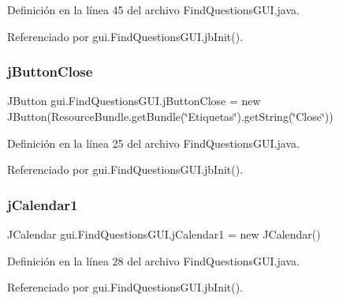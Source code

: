Definición en la línea 45 del archivo Find\+Questions\+G\+U\+I.\+java.



Referenciado por gui.\+Find\+Questions\+G\+U\+I.\+jb\+Init().

\mbox{\label{classgui_1_1FindQuestionsGUI_aa434da3107eda36011f1dd89b1c02d65}} 
\subsubsection{\texorpdfstring{jButtonClose}{jButtonClose}}
{\footnotesize\ttfamily J\+Button gui.\+Find\+Questions\+G\+U\+I.\+j\+Button\+Close = new J\+Button(Resource\+Bundle.\+get\+Bundle(\char`\"{}Etiquetas\char`\"{}).get\+String(\char`\"{}Close\char`\"{}))\hspace{0.3cm}{\ttfamily [private]}}



Definición en la línea 25 del archivo Find\+Questions\+G\+U\+I.\+java.



Referenciado por gui.\+Find\+Questions\+G\+U\+I.\+jb\+Init().

\mbox{\label{classgui_1_1FindQuestionsGUI_ae9cccb6f4b0319f8d786fa5040d6bed3}} 
\subsubsection{\texorpdfstring{jCalendar1}{jCalendar1}}
{\footnotesize\ttfamily J\+Calendar gui.\+Find\+Questions\+G\+U\+I.\+j\+Calendar1 = new J\+Calendar()\hspace{0.3cm}{\ttfamily [private]}}



Definición en la línea 28 del archivo Find\+Questions\+G\+U\+I.\+java.



Referenciado por gui.\+Find\+Questions\+G\+U\+I.\+jb\+Init().

\mbox{\label{classgui_1_1FindQuestionsGUI_a490e1658b079f1999219d1eb7c5bd0c4}} 
